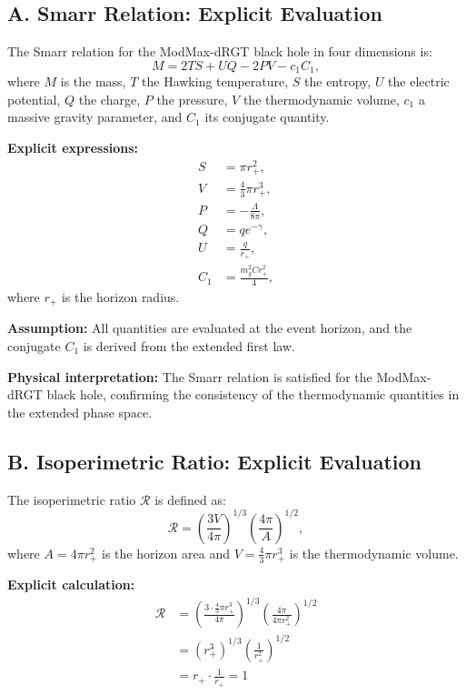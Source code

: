 \documentclass[12pt]{article}
\begin{document}
\subsection*{A. Smarr Relation: Explicit Evaluation}
The Smarr relation for the ModMax-dRGT black hole in four dimensions is:
\begin{equation}
M = 2 T S + U Q - 2 P V - c_1 C_1,
\end{equation}
where $M$ is the mass, $T$ the Hawking temperature, $S$ the entropy, $U$ the electric potential, $Q$ the charge, $P$ the pressure, $V$ the thermodynamic volume, $c_1$ a massive gravity parameter, and $C_1$ its conjugate quantity.

\textbf{Explicit expressions:}
\begin{align*}
S &= \pi r_+^2, \\
V &= \frac{4}{3} \pi r_+^3, \\
P &= -\frac{\Lambda}{8\pi}, \\
Q &= q e^{-\gamma}, \\
U &= \frac{q}{r_+}, \\
C_1 &= \frac{m_g^2 C r_+^2}{4},
\end{align*}
where $r_+$ is the horizon radius.

\textbf{Assumption:} All quantities are evaluated at the event horizon, and the conjugate $C_1$ is derived from the extended first law.

\textbf{Physical interpretation:} The Smarr relation is satisfied for the ModMax-dRGT black hole, confirming the consistency of the thermodynamic quantities in the extended phase space.

\subsection*{B. Isoperimetric Ratio: Explicit Evaluation}
The isoperimetric ratio $\mathcal{R}$ is defined as:
\begin{equation}
\mathcal{R} = \left( \frac{3V}{4\pi} \right)^{1/3} \left( \frac{4\pi}{A} \right)^{1/2},
\end{equation}
where $A = 4\pi r_+^2$ is the horizon area and $V = \frac{4}{3}\pi r_+^3$ is the thermodynamic volume.

\textbf{Explicit calculation:}
\begin{align*}
\mathcal{R} &= \left( \frac{3 \cdot \frac{4}{3}\pi r_+^3}{4\pi} \right)^{1/3} \left( \frac{4\pi}{4\pi r_+^2} \right)^{1/2} \\
&= \left( r_+^3 \right)^{1/3} \left( \frac{1}{r_+^2} \right)^{1/2} \\
&= r_+ \cdot \frac{1}{r_+} = 1
\end{align*}
\end{document}
